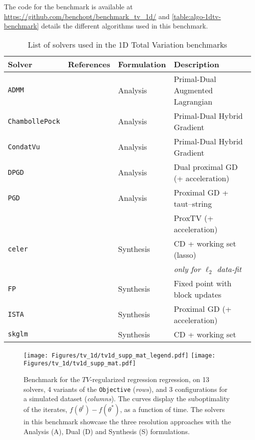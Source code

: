 \documentclass{article}
\newcommand{\repo}[1]{#1}
\newlength{\figwidth}
\begin{document}
\repo{The code for the benchmark is available at \url{https://github.com/benchopt/benchmark_tv_1d/} and} \autoref{table:algo-1dtv-benchmark} details the different algorithms used in this benchmark.


\begin{table}[h]
  \centering
  \small
  \caption{List of solvers used in the 1D Total Variation benchmarks}
\begin{tabular}{lllp{4.5cm}}
\toprule
  \textbf{Solver} & \textbf{References} & \textbf{Formulation} & \textbf{Description} \\
  \midrule
  \texttt{ADMM} &\citet{SBoyd2011} & Analysis
                     & Primal-Dual Augmented Lagrangian \\
  \texttt{ChambollePock} &\citet{ChambollePock2011} & Analysis
                     & Primal-Dual Hybrid Gradient \\
  \texttt{CondatVu} &\citet{Condat2013}  & Analysis
                     & Primal-Dual Hybrid Gradient \\
  \texttt{DPGD} &\citet{Pesquet2015}  & Analysis
                     & Dual proximal GD (+ acceleration)\\
  \texttt{PGD} &\citet{taut_string}  & Analysis
                     & Proximal GD + taut--string\\
               &\citet{ABarbero2018} &
                     & ProxTV (+ acceleration)\\
  \midrule\midrule
  \texttt{celer} &\citet{Massias_Gramfort_Salmon2018} & Synthesis
                     & CD + working set (lasso)\\
                     &&& \emph{only for $\ell_2$ data-fit}\\
  \texttt{FP} &\citet{Combettes2021} & Synthesis
                     & Fixed point with block updates \\
  \texttt{ISTA} &\citet{Daubechies2004} & Synthesis
                     & Proximal GD (+ acceleration)\\
  \texttt{skglm} &\citet{Bertrand_22} & Synthesis
                     & CD + working set\\
  \bottomrule
\end{tabular}
\vskip -0.1in
\label{table:algo-1dtv-benchmark}
\end{table}


\begin{figure}[t]
    \centering
    \texttt{[image: Figures/tv\_1d/tv1d\_supp\_mat\_legend.pdf]}
    \texttt{[image: Figures/tv\_1d/tv1d\_supp\_mat.pdf]}
    \caption{
        Benchmark for the $TV$-regularized regression regression, on 13 solvers, 4 variants of the \texttt{Objective} (\emph{rows}), and 3 configurations for a simulated dataset (\emph{columns}).
        The curves display the suboptimality of the iterates, $f(\theta^t) - f(\theta^*)$, as a function of time.
        The solvers in this benchmark showcase the three resolution approaches with the Analysis (A), Dual (D) and Synthesis (S) formulations.
    }
    \label{fig:tv1d}
\end{figure}
\end{document}
